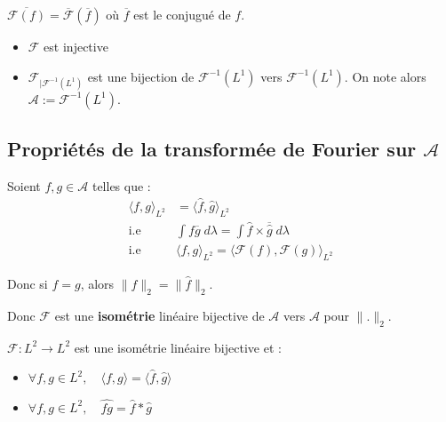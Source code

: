 \begin{remark}
    $\overline{\mathcal{F}(f)} = \overline{\mathcal{F}}(\overline{f})$ où $\overline{f}$ est le conjugué de $f$. 
\end{remark}

\begin{corollary}
    \begin{itemize}
        \item $\mathcal{F}$ est injective
        \item $\mathcal{F}_{ | \mathcal{F}^{-1}(L^1)}$ est une bijection de $\mathcal{F}^{-1}(L^1)$ vers $\mathcal{F}^{-1}(L^1)$. 
        On note alors $\mathcal{A} := \mathcal{F}^{-1}(L^1)$. 
    \end{itemize}
\end{corollary}

\subsection{Propriétés de la transformée de Fourier sur $\mathcal{A}$}

\begin{theorem}
    Soient $f,g \in \mathcal{A}$ telles que :
    \begin{align*}
        \langle f,g \rangle_{L^2} &= \langle \hat{f}, \hat{g} \rangle_{L^2} \\ 
        \text{i.e } & \int f \overline{g} \; d \lambda = \int \hat{f} \times \overline{\hat{g}} \; d \lambda \\ 
        \text{i.e } & \langle f, g \rangle_{L^2} = \langle \mathcal{F}(f), \mathcal{F}(g) \rangle_{L^2}
    \end{align*}

    Donc si $f=g$, alors $\| f \|_2 = \| \hat{f} \|_2$. 
    
    Donc $ \mathcal{F}$ est une \textbf{isométrie} linéaire bijective de $ \mathcal{A}$ vers $ \mathcal{A}$ pour $\|.\|_2$.
\end{theorem}

\begin{theorem}
    $ \mathcal{F} : L^2 \longrightarrow L^2$ est une isométrie linéaire bijective et :
    \begin{itemize}
        \item $ \forall f, g \in L^2, \quad \langle f, g \rangle = \langle \hat{f} , \hat{g} \rangle$ 
        \item $ \forall f, g \in L^2, \quad \widehat{fg} = \hat{f} \ast \hat{g} $ 
    \end{itemize}
\end{theorem}

